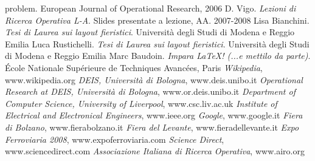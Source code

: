 \documentclass[12pt,a4paper,openright,twoside]{report}
\begin{document}
\begin{thebibliography}{40}
{problem}. European Journal of Operational Research, 2006
 D. Vigo. \emph{Lezioni di Ricerca Operativa L-A}. Slides presentate a lezione, AA. 2007-2008
 Lisa Bianchini. \emph{Tesi di Laurea sui layout fieristici}. Universit\`{a} degli Studi di Modena e Reggio Emilia
 Luca Rustichelli. \emph{Tesi di Laurea sui layout fieristici}. Universit\`{a} degli Studi di Modena e Reggio Emilia
 Marc Baudoin. \emph{Impara \LaTeX ! (...e mettilo da parte)}. \'{E}cole Nationale Sup\'{e}rieure de Techniques Avanc\'{e}es, Paris 
 \emph{Wikipedia}, www.wikipedia.org
 \emph{DEIS, Universit\`{a} di Bologna}, www.deis.unibo.it
 \emph{Operational Research at DEIS, Universit\`{a} di Bologna}, www.or.deis.unibo.it
 \emph{Department of Computer Science, University of Liverpool}, www.csc.liv.ac.uk
 \emph{Institute of Electrical and Electronical Engineers}, www.ieee.org 
 \emph{Google}, www.google.it
 \emph{Fiera di Bolzano}, www.fierabolzano.it
 \emph{Fiera del Levante}, www.fieradellevante.it
 \emph{Expo Ferroviaria 2008}, www.expoferroviaria.com
 \emph{Science Direct}, www.sciencedirect.com
 \emph{Associazione Italiana di Ricerca Operativa}, www.airo.org
\end{thebibliography} 
\end{document}
